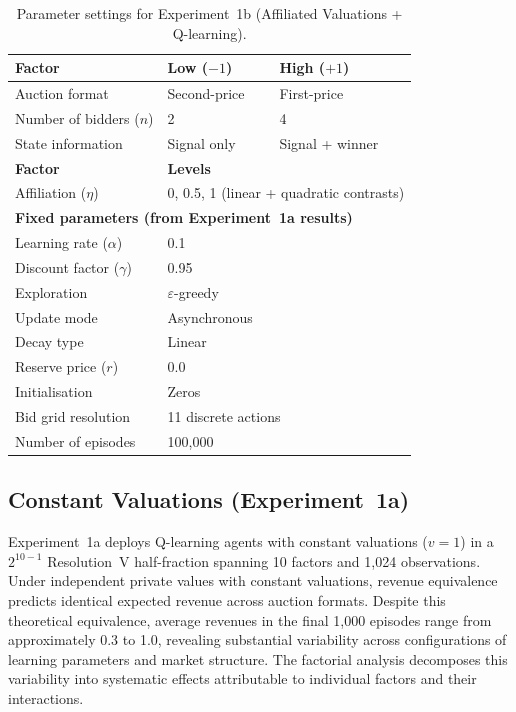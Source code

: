 \begin{table}[h]
\centering
\caption{Parameter settings for Experiment~1b (Affiliated Valuations + Q-learning).}
\label{tab:exp1b_params}
\begin{tabular}{l l l}
\toprule
\textbf{Factor} & \textbf{Low ($-1$)} & \textbf{High ($+1$)}\\
\midrule
Auction format & Second-price & First-price \\
Number of bidders ($n$) & 2 & 4 \\
State information & Signal only & Signal + winner \\
\midrule
\textbf{Factor} & \multicolumn{2}{l}{\textbf{Levels}} \\
\midrule
Affiliation ($\eta$) & \multicolumn{2}{l}{0, 0.5, 1 (linear + quadratic contrasts)} \\
\midrule
\multicolumn{3}{l}{\textbf{Fixed parameters (from Experiment~1a results)}} \\
\midrule
Learning rate ($\alpha$) & \multicolumn{2}{l}{0.1} \\
Discount factor ($\gamma$) & \multicolumn{2}{l}{0.95} \\
Exploration & \multicolumn{2}{l}{$\varepsilon$-greedy} \\
Update mode & \multicolumn{2}{l}{Asynchronous} \\
Decay type & \multicolumn{2}{l}{Linear} \\
Reserve price ($r$) & \multicolumn{2}{l}{0.0} \\
Initialisation & \multicolumn{2}{l}{Zeros} \\
Bid grid resolution & \multicolumn{2}{l}{11 discrete actions} \\
Number of episodes & \multicolumn{2}{l}{100{,}000} \\
\bottomrule
\end{tabular}
\end{table}

\subsection{Constant Valuations (Experiment~1a)}
\label{sec:exp1a_results}

Experiment~1a deploys Q-learning agents with constant valuations ($v=1$) in a $2^{10-1}$ Resolution~V half-fraction spanning 10 factors and 1{,}024 observations. Under independent private values with constant valuations, revenue equivalence \citep{Vickrey1961} predicts identical expected revenue across auction formats. Despite this theoretical equivalence, average revenues in the final 1{,}000 episodes range from approximately 0.3 to 1.0, revealing substantial variability across configurations of learning parameters and market structure. The factorial analysis decomposes this variability into systematic effects attributable to individual factors and their interactions.

